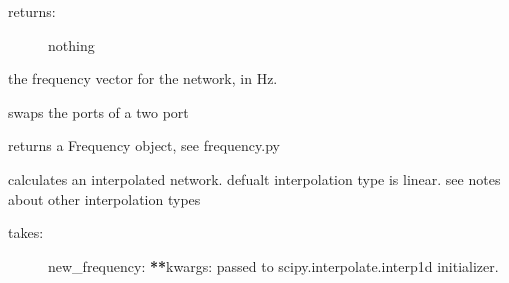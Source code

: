 \documentclass[letterpaper,10pt,english]{sphinxmanual}
\begin{document}
\begin{fulllineitems}
\begin{fulllineitems}
\begin{description}
\item[{returns:}] \leavevmode
nothing

\end{description}

\end{fulllineitems}


\begin{fulllineitems}
\label{api/mwavepy:mwavepy.network.Network.change_frequency}
\end{fulllineitems}


\begin{fulllineitems}
\label{api/mwavepy:mwavepy.network.Network.f}
the frequency vector for the network, in Hz.

\end{fulllineitems}


\begin{fulllineitems}
\label{api/mwavepy:mwavepy.network.Network.flip}
swaps the ports of a two port

\end{fulllineitems}


\begin{fulllineitems}
\label{api/mwavepy:mwavepy.network.Network.frequency}
returns a Frequency object, see  frequency.py

\end{fulllineitems}


\begin{fulllineitems}
\label{api/mwavepy:mwavepy.network.Network.interpolate}
calculates an interpolated network. defualt interpolation type
is linear. see notes about other interpolation types
\begin{description}
\item[{takes:}] \leavevmode
new\_frequency:
{\color{red}\bfseries{}**}kwargs: passed to scipy.interpolate.interp1d initializer.


\end{description}
\end{fulllineitems}
\end{fulllineitems}
\end{document}

